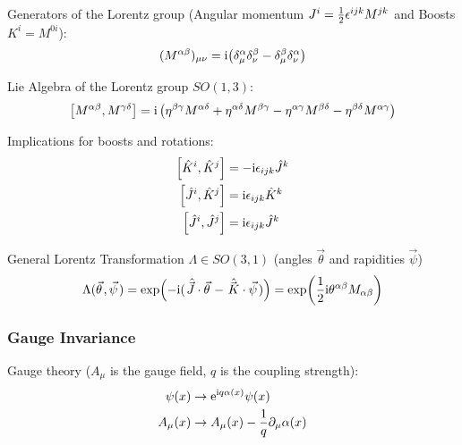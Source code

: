			\noindent
			Generators of the Lorentz group (Angular momentum $J^i = \frac{1}{2}\epsilon^{ijk} M^{jk}$ and Boosts $K^i = M^{0i}$):
			\begin{equation}
				\begin{aligned}
					(M^{\alpha\beta})_{\mu\nu} &= \mathrm{i}\qty(\delta^{\alpha}_{\mu}\delta^{\beta}_{\nu} - \delta^{\beta}_{\mu}\delta^{\alpha}_\nu ) \\
				\end{aligned}
			\end{equation}

			\noindent
			Lie Algebra of the Lorentz group $SO(1,3)$:
			\begin{equation}
				\begin{aligned}
					\comm{M^{\alpha\beta}}{M^{\gamma\delta}} = \i \left(\eta^{\beta\gamma}M^{\alpha\delta}+\eta^{\alpha\delta}M^{\beta\gamma}-\eta^{\alpha\gamma}M^{\beta\delta}-\eta^{\beta\delta}M^{\alpha\gamma}\right)
				\end{aligned}
			\end{equation}

			\noindent
			Implications for boosts and rotations:
			\begin{equation}
				\begin{aligned}
					\comm{\hat{K}^i}{\hat{K}^j} &= -\i \levicivita_{ijk}\hat{J}^k \\
					\comm{\hat{J}^i}{\hat{K}^j} &= \i \levicivita_{ijk}\hat{K}^k \\
					\comm{\hat{J}^i}{\hat{J}^j} &= \i \levicivita_{ijk}\hat{J}^k \\
				\end{aligned}
			\end{equation}

			\noindent
			General Lorentz Transformation $\Lambda\in SO(3,1)$ (angles $\vec{\theta}$ and rapidities $\vec{\psi}$)
			\begin{equation}
				\label{Eq:GeneralLorentzTransformation}
				\Lambda(\vec{\theta}, \vec{\psi})
				= \exp(-\i(\hat{\vec{J}}\cdot\vec{\theta} - \hat{\vec{K}}\cdot\vec{\psi}))
				= \exp(\frac{1}{2}\i \theta^{\alpha\beta} M_{\alpha\beta})
			\end{equation}

		\subsubsection{Gauge Invariance}
			Gauge theory ($A_\mu$ is the gauge field, $q$ is the coupling strength):
			\begin{equation}
				\begin{aligned}
					\psi(x) &\to \mathrm{e}^{\mathrm{i} q \alpha(x)}\psi(x) \\
					A_\mu(x) &\to A_\mu(x) - \frac{1}{q}\partial_\mu\alpha(x) \\
				\end{aligned}
			\end{equation}

